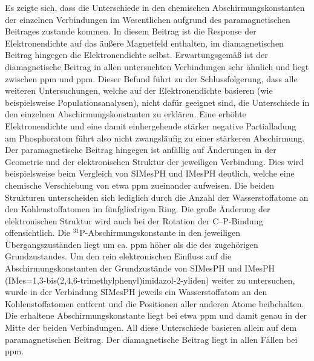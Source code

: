 \FloatBarrier

Es zeigte sich, dass die Unterschiede in den chemischen Abschirmungskonstanten der einzelnen Verbindungen im Wesentlichen aufgrund des paramagnetischen Beitrages zustande kommen. In diesem Beitrag ist die Response der Elektronendichte auf das äußere Magnetfeld enthalten, im diamagnetischen Beitrag hingegen die Elektronendichte selbst. Erwartungsgemäß ist der diamagnetische Beitrag in allen untersuchten Verbindungen sehr ähnlich und liegt zwischen \unit[960]{ppm} und \unit[967]{ppm}. Dieser Befund führt zu der Schlussfolgerung, dass alle weiteren Untersuchungen, welche auf der Elektronendichte basieren (wie beispielsweise Populationsanalysen), nicht dafür geeignet sind, die Unterschiede in den einzelnen Abschirmungskonstanten zu erklären. Eine erhöhte Elektronendichte und eine damit einhergehende stärker negative Partialladung am Phosphoratom führt also nicht zwangsläufig zu einer stärkeren Abschirmung. Der paramagnetische Beitrag hingegen ist anfällig auf Änderungen in der Geometrie und der elektronischen Struktur der jeweiligen Verbindung. Dies wird beispielsweise beim Vergleich von SIMesPH und IMesPH deutlich, welche eine chemische Verschiebung von etwa \unit[20]{ppm} zueinander aufweisen. Die beiden Strukturen unterscheiden sich lediglich durch die Anzahl der Wasserstoffatome an den Kohlenstoffatomen im fünfgliedrigen Ring. Die große Änderung der elektronischen Struktur wird auch bei der Rotation der C--P-Bindung offensichtlich. Die $^{31}$P-Abschirmungskonstante in den jeweiligen Übergangszuständen liegt um ca. \unit[60]{ppm} höher als die des zugehörigen Grundzustandes. Um den rein elektronischen Einfluss auf die Abschirmungskonstanten der Grundzustände von SIMesPH und IMesPH (IMes=1,3-bis(2,4,6-tri\-me\-thyl\-phe\-nyl)imi\-da\-zol-2-yli\-den) weiter zu untersuchen, wurde in der Verbindung SIMesPH jeweils ein Wasserstoffatom an den Kohlenstoffatomen entfernt und die Positionen aller anderen Atome beibehalten. Die erhaltene Abschirmungskonstante liegt bei etwa \unit[444]{ppm} und damit genau in der Mitte der beiden Verbindungen. All diese Unterschiede basieren allein auf dem paramagnetischen Beitrag. Der diamagnetische Beitrag liegt in allen Fällen bei \unit[962]{ppm}.

